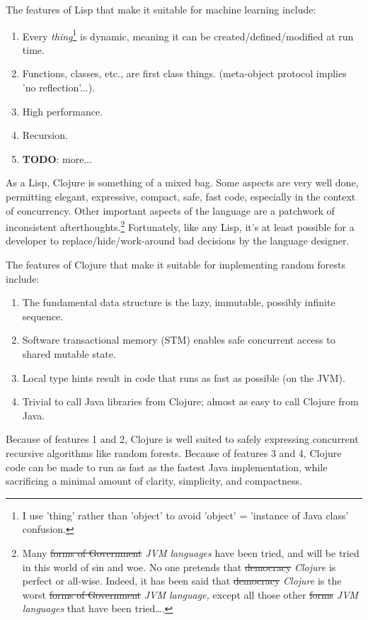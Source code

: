 \documentclass[10pt,openany]{article}
\numberwithin{definition}{section}
\numberwithin{example}{section}
\numberwithin{equation}{section}
\numberwithin{figure}{section}
\begin{document}
The features of Lisp that make it suitable for machine learning include:
\begin{enumerate}
\item Every \emph{thing}\footnote{I use 'thing' rather than 'object' to avoid 'object' = 'instance of
Java class' confusion.}\emph{ }is dynamic, meaning it can be created/defined/modified at
run time. 
\item Functions, classes, etc., are first class things. (meta-object protocol
implies 'no reflection'...). 
\item High performance.
\item Recursion.
\item \textbf{TODO}: more...
\end{enumerate}
As a Lisp, Clojure 
\cite{emerick2011clojure,fogus2011clojure,halloway2009clojure,rathore2011clojure,vanderhart2009clojure}
is something of a mixed bag. Some aspects are very well done, permitting
elegant, expressive, compact, safe, fast code, especially in the context
of concurrency. Other important aspects of the language are a patchwork
of inconsistent afterthoughts.\footnote{Many \sout{forms of Government}
 \emph{JVM languages} have been
tried, and will be tried in this world of sin and woe. No one pretends
that \sout{democracy} \emph{Clojure} is perfect or all-wise. Indeed,
it has been said that \sout{democracy} \emph{Clojure} is the worst
\sout{forms of Government} \emph{JVM language,} except all those
other \sout{forms} \emph{JVM languages} that have been 
tried\ldots{}.\cite{churchill-democracy-1947}} 
Fortunately, like any Lisp, it's at least possible for a developer
to replace/hide/work-around bad decisions by the language
designer.

The features of Clojure that make it suitable for implementing random
forests include:
\begin{enumerate}
\item The fundamental data structure is the lazy, immutable, possibly infinite
sequence.
\item Software transactional memory (STM) enables safe concurrent access
to shared mutable state.
\item Local type hints result in code that runs as fast as possible (on
the JVM).
\item Trivial to call Java libraries from Clojure; almost as easy to call
Clojure from Java.
\end{enumerate}
Because of features 1 and 2, Clojure is well suited to safely expressing
concurrent recursive algorithms like random forests. Because of features
3 and 4, Clojure code can be made to run as fast as the fastest Java
implementation, while sacrificing a minimal amount of clarity, simplicity,
and compactness. 
\end{document}
